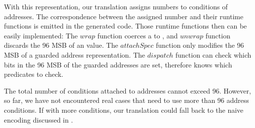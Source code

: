 With this representation, our translation assigns numbers to conditions of addresses.
The correspondence between the assigned number and their runtime functions is emitted 
in the generated code.
Those runtime functions then can be easily implemented: The $\mathit{wrap}$ function coerces a 
 to , and $\mathit{unwrap}$ function discards the 96 MSB of an  value.
The $\mathit{attachSpec}$ function only modifies the 96 MSB of a guarded address representation.
The $\mathit{dispatch}$ function can check which bits in the 96 MSB of the guarded addresses
are set, therefore knows which predicates to check.

The total number of conditions attached to addresses cannot exceed 96.
However, so far, we have not encountered real cases that need to use more than 96 address conditions. 
If with more conditions, our translation could fall back to the naive encoding discussed in .

\iffalse
+ representing guarded address
+ eliminate redundant calls - the compiler should do so ... (e.g., from guarded to worker)
+ combining pre-/post-conditions in different functions (many functions share the same precondition), 
  to reduce the number of specs 
+ Syntax sugar?
\fi
